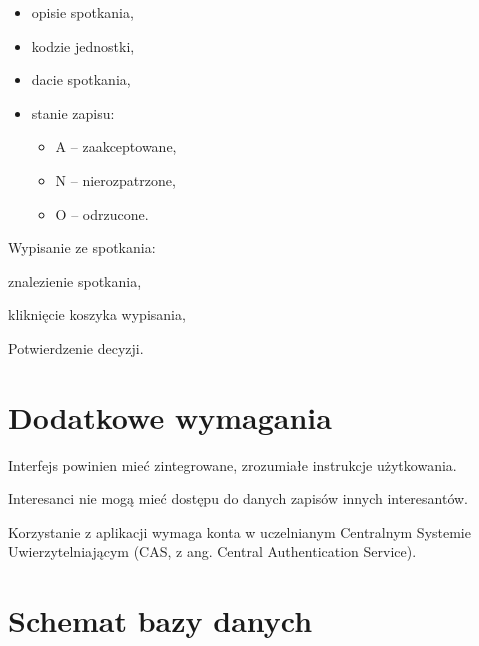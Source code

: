 \documentclass[licencjacka]{pracamgr}
\begin{document}
\begin{step}
\begin{step}
\begin{itemize}
							\item opisie spotkania,
							\item kodzie jednostki,
							\item dacie spotkania,
							\item stanie zapisu:
								\begin{itemize}
									\item A -- zaakceptowane,
									\item N -- nierozpatrzone,
									\item O -- odrzucone.
								\end{itemize}
						\end{itemize}
				\end{step}
			\item Wypisanie ze spotkania:
				\begin{step}
					\item znalezienie spotkania,
					\item kliknięcie koszyka wypisania,
					\item Potwierdzenie decyzji.
				\end{step}
	\end{step}
	

\section{Dodatkowe wymagania}
	\begin{step}
		\item Interfejs powinien mieć zintegrowane, zrozumiałe instrukcje użytkowania.
		\item Interesanci nie mogą mieć dostępu do danych zapisów innych interesantów.
		\item Korzystanie z aplikacji wymaga konta w uczelnianym Centralnym Systemie Uwierzytelniającym (CAS, z ang. Central Authentication Service).
	\end{step}
	
\section{Schemat bazy danych}
\end{document}
